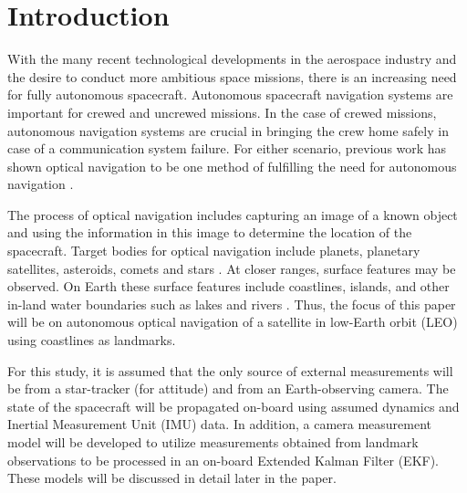 \documentclass[]{aiaa-tc}%
\begin{document}
\section{Introduction}
With the many recent technological developments in the aerospace industry and the desire to conduct more ambitious space missions, there is an increasing need for fully autonomous spacecraft.  Autonomous spacecraft navigation systems are important for crewed and uncrewed missions.  In the case of crewed missions, autonomous navigation systems are crucial in bringing the crew home safely in case of a communication system failure.  For either scenario, previous work has shown optical navigation to be one method of fulfilling the need for autonomous navigation \cite{Christian:2012}.

The process of optical navigation includes capturing an image of a known object and using the information in this image to determine the location of the spacecraft.  Target bodies for optical navigation include planets, planetary satellites, asteroids, comets and stars \cite{Owen:2011}.  At closer ranges, surface features may be observed.  On Earth these surface features include coastlines, islands, and other in-land water boundaries such as lakes and rivers \cite{Liu:2004}.  Thus, the focus of this paper will be on autonomous optical navigation of a satellite in low-Earth orbit (LEO) using coastlines as landmarks.  

For this study, it is assumed that the only source of external measurements will be from a star-tracker (for attitude) and from an Earth-observing camera.  The state of the spacecraft will be propagated on-board using assumed dynamics and Inertial Measurement Unit (IMU) data.  In addition, a camera measurement model will be developed to utilize measurements obtained from landmark observations to be processed in an on-board Extended Kalman Filter (EKF).  These models will be discussed in detail later in the paper.

\end{document}
